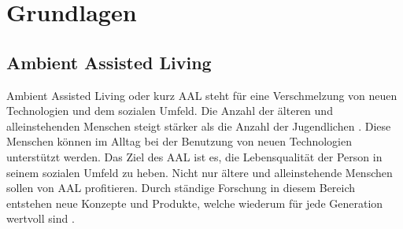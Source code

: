 \chapter{Grundlagen}

\section{Ambient Assisted Living}

Ambient Assisted Living oder kurz AAL steht für eine Verschmelzung von neuen Technologien und
dem sozialen Umfeld.
Die Anzahl der älteren und alleinstehenden Menschen steigt stärker als die Anzahl der Jugendlichen
\cite[Innovationen für ein selbstbestimmtes Leben]{aal_deutschland}.
Diese Menschen können im Alltag bei der Benutzung von neuen Technologien unterstützt werden.
Das Ziel des AAL ist es, die Lebensqualität der Person in seinem sozialen Umfeld zu heben.
Nicht nur ältere und alleinstehende Menschen sollen von AAL profitieren.
Durch ständige Forschung in diesem Bereich entstehen neue Konzepte und Produkte, welche wiederum
für jede Generation wertvoll sind \cite{mtidw}.
